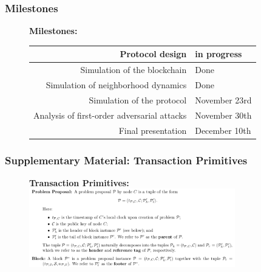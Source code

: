 \documentclass{beamer}
\begin{document}
\begin{frame}
	\frametitle{Milestones}
	\begin{figure}
		\textbf{Milestones:} \\
		\vspace{3mm}
		\begin{tabular}{|r|l|}
			\hline
			Protocol design & in progress \\
			\hline
			Simulation of the blockchain & Done \\
			\hline
			Simulation of neighborhood dynamics & Done \\
			\hline
			Simulation of the protocol & November 23rd \\ %
			\hline
			Analysis of first-order adversarial attacks & November 30th \\
			\hline
			Final presentation & December 10th \\
			\hline
		\end{tabular}
	\end{figure}
\end{frame}

\begin{frame}
	\frametitle{Supplementary Material: Transaction Primitives}
	\begin{figure}
		\centering
		\textbf{Transaction Primitives:} \\
		\vspace{5mm}
		\includegraphics[width=0.8\textwidth]{decker_figures/tentative_fig.png}
	\end{figure}
\end{frame}
\end{document}
